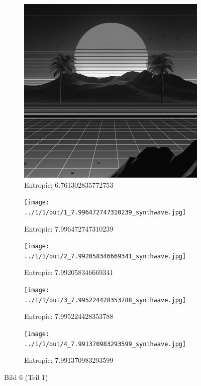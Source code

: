 \begin{figure}
	\centering

	\begin{subfigure}{0.25\textwidth}
		\includegraphics[width=\textwidth]{../1/3/gray_6.761302835772753_synthwave.jpg}
		\caption{Entropie: 6.761302835772753}
	\end{subfigure}

	\begin{subfigure}{0.25\textwidth}
		\texttt{[image: ../1/1/out/1\_7.996472747310239\_synthwave.jpg]}
		\caption{Entropie: 7.996472747310239}
	\end{subfigure}

	\begin{subfigure}{0.25\textwidth}
		\texttt{[image: ../1/1/out/2\_7.992058346669341\_synthwave.jpg]}
		\caption{Entropie: 7.992058346669341}
	\end{subfigure}

	\begin{subfigure}{0.25\textwidth}
		\texttt{[image: ../1/1/out/3\_7.995224428353788\_synthwave.jpg]}
		\caption{Entropie: 7.995224428353788}
	\end{subfigure}

	\begin{subfigure}{0.25\textwidth}
		\texttt{[image: ../1/1/out/4\_7.991370983293599\_synthwave.jpg]}
		\caption{Entropie: 7.991370983293599}
	\end{subfigure}
	\caption{Bild 6 (Teil 1)}
\end{figure}
